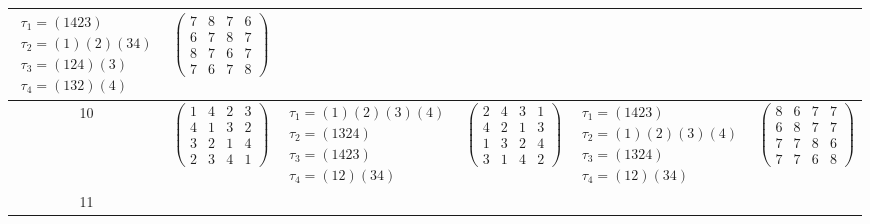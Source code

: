 \begin{longtable}{|c|p{2.7cm}|p{2.7cm}|p{2.7cm}|p{2.7cm}|p{2.7cm}|}
    $\begin{array}{l}\tau_{1}=(1423)\\ \tau_{2}=(1)(2)(34)\\ \tau_{3}=(124)(3)\\ \tau_{4}=(132)(4)\end{array}$     &
    $\begin{pmatrix} 7 & 8 & 7 & 6 \\ 6 & 7 & 8 & 7 \\ 8 & 7 & 6 & 7 \\ 7 & 6 & 7 & 8 \end{pmatrix}$                                                                                           \\
    \hline
    10                                                                                                             &
    $\begin{pmatrix} 1 & 4 & 2 & 3 \\ 4 & 1 & 3 & 2 \\ 3 & 2 & 1 & 4 \\ 2 & 3 & 4 & 1 \end{pmatrix}$               &
    $\begin{array}{l}\tau_{1}=(1)(2)(3)(4)\\ \tau_{2}=(1324)\\ \tau_{3}=(1423)\\ \tau_{4}=(12)(34)\end{array}$     &
    $\begin{pmatrix} 2 & 4 & 3 & 1 \\ 4 & 2 & 1 & 3 \\ 1 & 3 & 2 & 4 \\ 3 & 1 & 4 & 2 \end{pmatrix}$               &
    $\begin{array}{l}\tau_{1}=(1423)\\ \tau_{2}=(1)(2)(3)(4)\\ \tau_{3}=(1324)\\ \tau_{4}=(12)(34)\end{array}$     &
    $\begin{pmatrix} 8 & 6 & 7 & 7 \\ 6 & 8 & 7 & 7 \\ 7 & 7 & 8 & 6 \\ 7 & 7 & 6 & 8 \end{pmatrix}$                                                                                           \\
    \hline
    11                                                                                                             &

\end{longtable}
